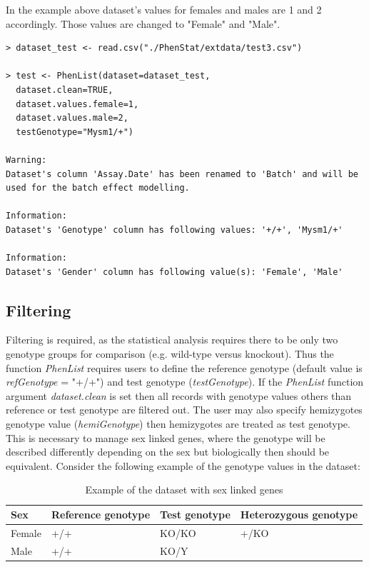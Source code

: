 \documentclass[12pt,a4paper]{article}
\begin{document}
In the example above dataset's values for females and males are 1 and 2 accordingly. Those values are changed to "Female" and "Male".  
\begingroup
    \fontsize{8pt}{12pt}\selectfont
\begin{verbatim}
> dataset_test <- read.csv("./PhenStat/extdata/test3.csv")

> test <- PhenList(dataset=dataset_test, 
  dataset.clean=TRUE, 
  dataset.values.female=1, 
  dataset.values.male=2, 
  testGenotype="Mysm1/+")

Warning:
Dataset's column 'Assay.Date' has been renamed to 'Batch' and will be used for the batch effect modelling.

Information:
Dataset's 'Genotype' column has following values: '+/+', 'Mysm1/+'

Information:
Dataset's 'Gender' column has following value(s): 'Female', 'Male'  
\end{verbatim}
\endgroup

\subsection{Filtering}
\label{section:Filtering}
Filtering is required, as the statistical analysis requires there to be only two genotype groups for comparison (e.g. wild-type versus knockout). 
Thus the function \textit{PhenList} requires users to define the reference genotype (default value is \textit{refGenotype} = "+\slash+") and test genotype (\textit{testGenotype}). 
If the \textit{PhenList} function argument \textit{dataset.clean} is set then all records with genotype values others than reference or test genotype are filtered out. 
The user may also specify hemizygotes genotype value (\textit{hemiGenotype}) then hemizygotes are treated as test genotype. 
This is necessary to manage sex linked genes, where the genotype will be described differently depending on the sex but biologically then should be equivalent. 
Consider the following example of the genotype values in the dataset:
\begin{table}[!h]
\caption{Example of the dataset with sex linked genes}\label{table:01}
\begin{center}
\begin{tabular}{| l | l | l | l |}
  \hline
Sex&Reference genotype&Test genotype&Heterozygous genotype\\\hline
Female&+\slash +&KO\slash KO&+\slash KO\\
Male&+\slash +&KO\slash Y& \\
\hline  
\end{tabular}
\end{center}
\end{table}
\end{document}
